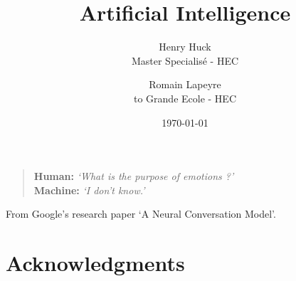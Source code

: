 \documentclass[12pt]{article}
\title{Artificial Intelligence}
\author{
        Henry Huck \\
        Master Specialisé - HEC \\
        \and
        Romain Lapeyre\\to
        Grande Ecole - HEC\\
}
\date{\today}
\begin{document}
\maketitle
\thispagestyle{empty}

\pagebreak


\phantom{TEXT}
\thispagestyle{empty}

\vspace{200pt}
\begin{quotation}
\noindent \textbf{Human:}  \textit{\lq What is the purpose of emotions ?\rq }
\\

\noindent \textbf{Machine:} \textit{\lq I don't know.\rq}
\end{quotation}

\vspace{200pt}

\begin{flushright}
   From Google's research paper \lq A Neural Conversation Model\rq. \cite{seq2seq}
\end{flushright}


\pagebreak


\smallskip

\tableofcontents

\pagebreak


\section*{Acknowledgments}

\pagebreak

\end{document}
